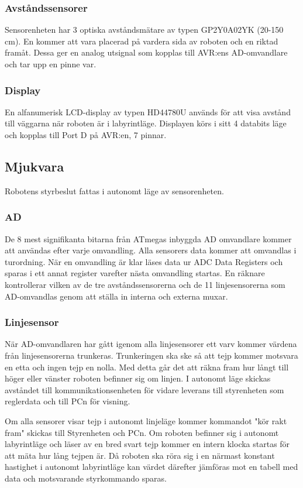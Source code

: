 \subsubsection{Avståndssensorer}
Sensorenheten har 3 optiska avståndsmätare av typen GP2Y0A02YK (20-150 cm). En kommer att vara placerad på vardera sida av roboten och en riktad framåt. Dessa ger en analog utsignal som kopplas till AVR:ens AD-omvandlare och tar upp en pinne var.

\subsubsection{Display}
En alfanumerisk LCD-display av typen HD44780U används för att visa avstånd till väggarna när roboten är i labyrintläge. Displayen körs i sitt 4 databits läge och kopplas till Port D på AVR:en, 7 pinnar.


\subsection{Mjukvara}
Robotens styrbeslut fattas i autonomt läge av sensorenheten.

\subsubsection{AD}
De 8 mest signifikanta bitarna från ATmegas inbyggda AD omvandlare kommer att användas efter varje omvandling. Alla sensorers data kommer att omvandlas i turordning. När en omvandling är klar läses data ur ADC Data Registers och sparas i ett annat register varefter nästa omvandling startas. En räknare kontrollerar vilken av de tre avståndssensorerna och de 11 linjesensorerna som AD-omvandlas genom att ställa in interna och externa muxar.

\subsubsection{Linjesensor}
När AD-omvandlaren har gått igenom alla linjesensorer ett varv kommer värdena från linjesensorerna trunkeras. Trunkeringen ska ske så att tejp kommer motsvara en etta och ingen tejp en nolla. Med detta går det att räkna fram hur långt till höger eller vänster roboten befinner sig om linjen. I autonomt läge skickas avståndet till kommunikationsenheten för vidare leverans till styrenheten som reglerdata och till PCn för visning.

Om alla sensorer visar tejp i autonomt linjeläge kommer kommandot "kör rakt fram" skickas till Styrenheten och PCn.
Om roboten befinner sig i autonomt labyrintläge och läser av en bred svart tejp kommer en intern klocka startas för att mäta hur lång tejpen är. Då roboten ska röra sig i en närmast konstant hastighet i autonomt labyrintläge kan värdet därefter jämföras mot en tabell med data och motsvarande styrkommando sparas. 

